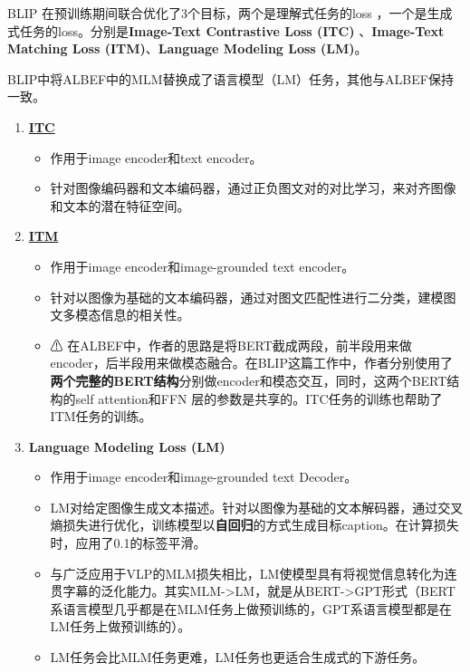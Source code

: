\documentclass[zihao=false,fontset=windows]{ctexart}
\newcommand{\feiEmoji}[1]{{\emojifont #1}}
\begin{document}
\par\vspace{1.15em}\par\vspace{0.28em}
BLIP 在预训练期间联合优化了3个目标，两个是理解式任务的loss ，一个是生成式任务的loss。分别是\textbf{Image-Text Contrastive Loss (ITC) }、\textbf{Image-Text Matching Loss (ITM)}、\textbf{Language Modeling Loss (LM)}。\par
BLIP中将ALBEF中的MLM替换成了语言模型（LM）任务，其他与ALBEF保持一致。\par
\begin{enumerate}
\item \href{https://scnajei2ds6y.feishu.cn/wiki/U5sZwCwKwivERwktFWvcdM50nkf\#HFfNdb3hbobohJxMPu3cEHuPnue}{\textbf{ITC}}
\begin{itemize}
\item 作用于image encoder和text encoder。
\item 针对图像编码器和文本编码器，通过正负图文对的对比学习，来对齐图像和文本的潜在特征空间。
\end{itemize}
\item \href{https://scnajei2ds6y.feishu.cn/wiki/U5sZwCwKwivERwktFWvcdM50nkf\#S7ObdE0VwojSbQxDqNJcmZmQnpb}{\textbf{ITM}}
\begin{itemize}
\item 作用于image encoder和image-grounded text encoder。
\item 针对以图像为基础的文本编码器，通过对图文匹配性进行二分类，建模图文多模态信息的相关性。
\item \feiEmoji{⚠} 在ALBEF中，作者的思路是将BERT截成两段，前半段用来做encoder，后半段用来做模态融合。在BLIP这篇工作中，作者分别使用了\textbf{两个完整的BERT结构}分别做encoder和模态交互，同时，这两个BERT结构的self attention和FFN 层的参数是共享的。ITC任务的训练也帮助了ITM任务的训练。
\end{itemize}
\item \textbf{Language Modeling Loss (LM)}
\begin{itemize}
\item 作用于image encoder和image-grounded text Decoder。
\item LM对给定图像生成文本描述。针对以图像为基础的文本解码器，通过交叉熵损失进行优化，训练模型以\textbf{自回归}的方式生成目标caption。在计算损失时，应用了0.1的标签平滑。
\item 与广泛应用于VLP的MLM损失相比，LM使模型具有将视觉信息转化为连贯字幕的泛化能力。其实MLM->LM，就是从BERT->GPT形式（BERT系语言模型几乎都是在MLM任务上做预训练的，GPT系语言模型都是在LM任务上做预训练的）。
\item LM任务会比MLM任务更难，LM任务也更适合生成式的下游任务。
\end{itemize}
\end{enumerate}
\end{document}
